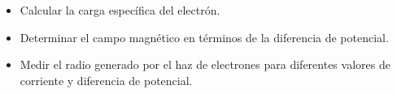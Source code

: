 \begin{itemize}
    \item Calcular la carga específica del electrón.
    \item Determinar el campo magnético en términos de la diferencia de potencial.
    \item Medir el radio generado por el haz de electrones para diferentes valores de corriente y diferencia de potencial.
\end{itemize}
